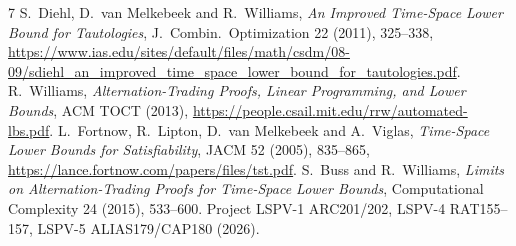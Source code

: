 \documentclass[11pt]{article}
\begin{document}
\begin{thebibliography}{7}
 S.~Diehl, D.~van Melkebeek and R.~Williams, \emph{An Improved Time-Space Lower Bound for Tautologies}, J.\ Combin.\ Optimization 22 (2011), 325--338, \url{https://www.ias.edu/sites/default/files/math/csdm/08-09/sdiehl_an_improved_time_space_lower_bound_for_tautologies.pdf}.
 R.~Williams, \emph{Alternation-Trading Proofs, Linear Programming, and Lower Bounds}, ACM TOCT (2013), \url{https://people.csail.mit.edu/rrw/automated-lbs.pdf}.
 L.~Fortnow, R.~Lipton, D.~van Melkebeek and A.~Viglas, \emph{Time-Space Lower Bounds for Satisfiability}, JACM 52 (2005), 835--865, \url{https://lance.fortnow.com/papers/files/tst.pdf}.
 S.~Buss and R.~Williams, \emph{Limits on Alternation-Trading Proofs for Time-Space Lower Bounds}, Computational Complexity 24 (2015), 533--600.
 Project LSPV-1 ARC201/202, LSPV-4 RAT155--157, LSPV-5 ALIAS179/CAP180 (2026).
\end{thebibliography}
\end{document}
